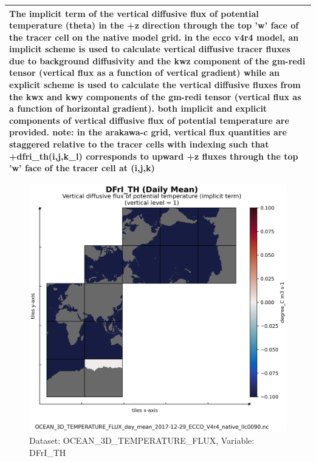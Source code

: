 \begin{longtable}{|m{}|m{}|m{}|m{}|}
\multicolumn{4}{|p{1\textwidth}|}{\footnotesize{{The implicit term of the vertical diffusive flux of potential temperature (theta) in the +z direction through the top 'w' face of the tracer cell on the native model grid. in the ecco v4r4 model, an implicit scheme is used to calculate vertical diffusive tracer fluxes due to background diffusivity and the kwz component of the gm-redi tensor (vertical flux as a function of vertical gradient) while an explicit scheme is used to calculate the vertical diffusive fluxes from the kwx and kwy components of the gm-redi tensor (vertical flux as a function of horizontal gradient). both implicit and explicit components of vertical diffusive flux of potential temperature are provided. note: in the arakawa-c grid, vertical flux quantities are staggered relative to the tracer cells with indexing such that +dfri\_th(i,j,k\_l) corresponds to upward +z fluxes through the top 'w' face of the tracer cell at (i,j,k)}}} \\ \hline
\end{longtable}

\begin{figure}[H]
\centering
\includegraphics[scale=0.55]{../images/plots/v4r4/native_plots/Ocean_Three-Dimensional_Potential_Temperature_Fluxes/DFrI_TH.png}
\caption{Dataset: OCEAN\_3D\_TEMPERATURE\_FLUX, Variable: DFrI\_TH}
\label{tab:table-OCEAN_3D_TEMPERATURE_FLUX_DFrI_TH-Plot}
\end{figure}
\newpage
\pagebreak
